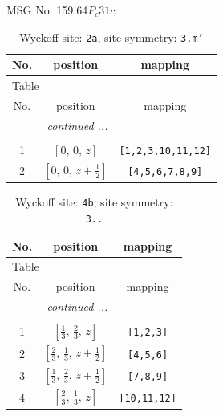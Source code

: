 \documentclass[fleqn,8pt]{jsarticle}
\begin{document}
\setcounter{MaxMatrixCols}{32}

\renewcommand{\tablename}{Table~}
\renewcommand{\figurename}{Figure~}
\begin{center}
\LARGE
MSG No. 159.64\quad$P_{c}31c$
\end{center}
\renewcommand{\arraystretch}{1.2}
\begin{longtable}{ccc}
\caption{Wyckoff site: {\tt 2a}, site symmetry: {\tt 3.m'}}
 \\
 \hline \hline
No. & position & mapping \\ \hline \endfirsthead

\multicolumn{2}{l}{\tablename\ \thetable{}} \\
 \hline \hline
No. & position & mapping \\ \hline \endhead

 \hline \hline
\multicolumn{2}{r}{\footnotesize\it continued ...} \\ \endfoot

 \hline \hline
\multicolumn{2}{r}{} \\ \endlastfoot

1 & $\left[ 0,\, 0,\, z \right]$ & {\tt [1,2,3,10,11,12]} \\ \hline
2 & $\left[ 0,\, 0,\, z + \frac{1}{2} \right]$ & {\tt [4,5,6,7,8,9]} \\
\end{longtable}
\renewcommand{\arraystretch}{1.2}
\begin{longtable}{ccc}
\caption{Wyckoff site: {\tt 4b}, site symmetry: {\tt 3..}}
 \\
 \hline \hline
No. & position & mapping \\ \hline \endfirsthead

\multicolumn{2}{l}{\tablename\ \thetable{}} \\
 \hline \hline
No. & position & mapping \\ \hline \endhead

 \hline \hline
\multicolumn{2}{r}{\footnotesize\it continued ...} \\ \endfoot

 \hline \hline
\multicolumn{2}{r}{} \\ \endlastfoot

1 & $\left[ \frac{1}{3},\, \frac{2}{3},\, z \right]$ & {\tt [1,2,3]} \\ \hline
2 & $\left[ \frac{2}{3},\, \frac{1}{3},\, z + \frac{1}{2} \right]$ & {\tt [4,5,6]} \\ \hline
3 & $\left[ \frac{1}{3},\, \frac{2}{3},\, z + \frac{1}{2} \right]$ & {\tt [7,8,9]} \\ \hline
4 & $\left[ \frac{2}{3},\, \frac{1}{3},\, z \right]$ & {\tt [10,11,12]} \\
\end{longtable}
\end{document}
